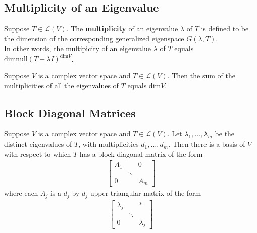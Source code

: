 \documentclass{memoir}
\begin{document}
\subsection{Multiplicity of an Eigenvalue}
\label{subsec:multiplicity_of_an_eigenvalue}
\begin{defn}[Multiplicity]
	Suppose \(T \in \mathcal{L}(V)\). The \textbf{multiplicity} of an eigenvalue \(\lambda\) of \(T\) is defined to be the dimension of the corresponding generalized eigenspace \(G(\lambda,T)\).\\

	In other words, the multipicity of an eigenvalue \(\lambda\) of \(T\) equals \( \textrm{dim} \textrm{null}(T-\lambda I)^{ \textrm{dim} V}\).
\end{defn}
\begin{prop}
	Suppose \(V\) is a complex vector space and \(T \in \mathcal{L}(V)\). Then the sum of the multiplicities of all the eigenvalues of \(T\) equals \( \textrm{dim}V\).
\end{prop}

\subsection{Block Diagonal Matrices}
\label{subsec:block_diagonal_matrices}

\begin{prop}
	Suppose \(V\) is a complex vector space and \(T \in \mathcal{L}(V)\). Let \(\lambda_1,\ldots,\lambda_m\) be the distinct eigenvalues of \(T\), with multiplicities \(d_1,\ldots,d_m\). Then there is a basis of \(V\) with respect to which \(T\) has a block diagonal matrix of the form
	\begin{align*}
		\begin{bmatrix} A_1 & & 0 \\ & \ddots & \\ 0 & & A_m \end{bmatrix} 
	\end{align*}
where each \(A_j\) is a \(d_j\)-by-\(d_j\) upper-triangular matrix of the form
\begin{align*}
	\begin{bmatrix} \lambda_j & &* \\ & \ddots & \\ 0 & & \lambda_j \end{bmatrix} 
\end{align*}
\end{prop}
\end{document}
